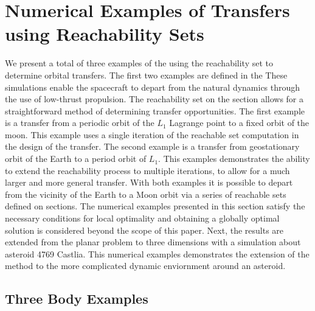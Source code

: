 \section{Numerical Examples of Transfers using Reachability Sets}\label{sec:simulation}

We present a total of three examples of the using the reachability set to determine orbital transfers.
The first two examples are defined in the
These simulations enable the spacecraft to depart from the natural dynamics through the use of low-thrust propulsion.
The reachability set on the \Poincare section allows for a straightforward method of determining transfer opportunities.
The first example is a transfer from a periodic orbit of the \( L_1 \) Lagrange point to a fixed orbit of the moon.
This example uses a single iteration of the reachable set computation in the design of the transfer.
The second example is a transfer from geostationary orbit of the Earth to a period orbit of \( L_1 \). 
This examples demonstrates the ability to extend the reachability process to multiple iterations, to allow for a much larger and more general transfer.
With both examples it is possible to depart from the vicinity of the Earth to a Moon orbit via a series of reachable sets defined on \Poincare sections.
The numerical examples presented in this section satisfy the necessary conditions for local optimality and obtaining a globally optimal solution is considered beyond the scope of this paper.
Next, the results are extended from the planar problem to three dimensions with a simulation about asteroid 4769 Castlia.
This numerical examples demonstrates the extension of the method to the more complicated dynamic enviornment around an asteroid.

\subsection{Three Body Examples}

